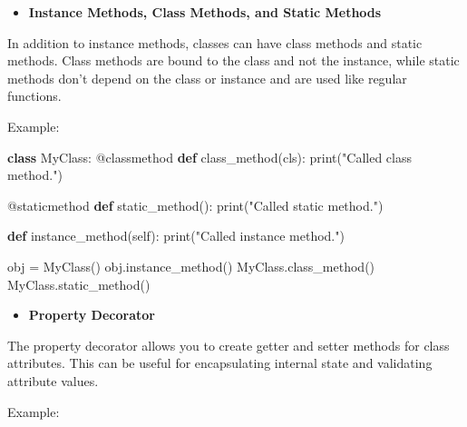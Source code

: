 \documentclass[
  paper=a4,
  ,captions=tableheading
]{scrartcl}
\newenvironment{Shaded}{}{}
\newcommand{\AttributeTok}[1]{\textcolor[rgb]{0.49,0.56,0.16}{#1}}
\newcommand{\BuiltInTok}[1]{\textcolor[rgb]{0.00,0.50,0.00}{#1}}
\newcommand{\KeywordTok}[1]{\textcolor[rgb]{0.00,0.44,0.13}{\textbf{#1}}}
\newcommand{\NormalTok}[1]{#1}
\newcommand{\OperatorTok}[1]{\textcolor[rgb]{0.40,0.40,0.40}{#1}}
\newcommand{\StringTok}[1]{\textcolor[rgb]{0.25,0.44,0.63}{#1}}
\newcommand{\VariableTok}[1]{\textcolor[rgb]{0.10,0.09,0.49}{#1}}
\providecommand{\tightlist}{%
  \setlength{\itemsep}{0pt}\setlength{\parskip}{0pt}}
\begin{document}
\begin{itemize}
\tightlist
\item
  \textbf{Instance Methods, Class Methods, and Static Methods}
\end{itemize}

In addition to instance methods, classes can have class methods and
static methods. Class methods are bound to the class and not the
instance, while static methods don't depend on the class or instance and
are used like regular functions.

Example:

\begin{Shaded}
\begin{Highlighting}[]
\KeywordTok{class}\NormalTok{ MyClass:}
    \AttributeTok{@classmethod}
    \KeywordTok{def}\NormalTok{ class\_method(cls):}
        \BuiltInTok{print}\NormalTok{(}\StringTok{"Called class method."}\NormalTok{)}

    \AttributeTok{@staticmethod}
    \KeywordTok{def}\NormalTok{ static\_method():}
        \BuiltInTok{print}\NormalTok{(}\StringTok{"Called static method."}\NormalTok{)}

    \KeywordTok{def}\NormalTok{ instance\_method(}\VariableTok{self}\NormalTok{):}
        \BuiltInTok{print}\NormalTok{(}\StringTok{"Called instance method."}\NormalTok{)}

\NormalTok{obj }\OperatorTok{=}\NormalTok{ MyClass()}
\NormalTok{obj.instance\_method()}
\NormalTok{MyClass.class\_method()}
\NormalTok{MyClass.static\_method()}
\end{Highlighting}
\end{Shaded}

\begin{itemize}
\tightlist
\item
  \textbf{Property Decorator}
\end{itemize}

The property decorator allows you to create getter and setter methods
for class attributes. This can be useful for encapsulating internal
state and validating attribute values.

Example:
\end{document}
